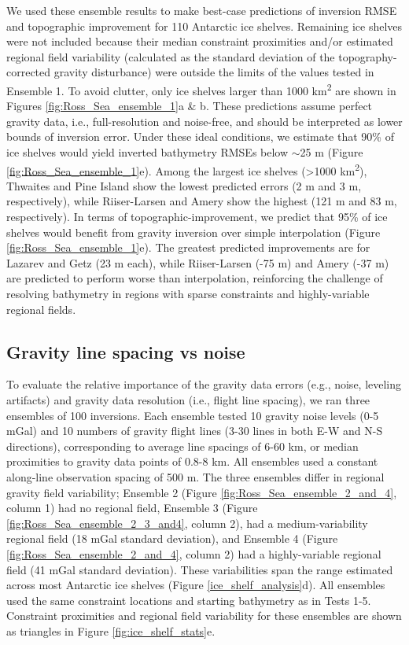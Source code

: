 \documentclass[tc, manuscript]{copernicus}
\begin{document}
We used these ensemble results to make best-case predictions of inversion RMSE and topographic improvement for 110 Antarctic ice shelves. Remaining ice shelves were not included because their median constraint proximities and/or estimated regional field variability (calculated as the standard deviation of the topography-corrected gravity disturbance) were outside the limits of the values tested in Ensemble 1. To avoid clutter, only ice shelves larger than 1000 km\textsuperscript{2} are shown in Figures \ref{fig:Ross_Sea_ensemble_1}a \& b. These predictions assume perfect gravity data, i.e., full-resolution and noise-free, and should be interpreted as lower bounds of inversion error. Under these ideal conditions, we estimate that 90\% of ice shelves would yield inverted bathymetry RMSEs below $\sim$25 m (Figure \ref{fig:Ross_Sea_ensemble_1}e). Among the largest ice shelves (\textgreater 1000 km\textsuperscript{2}), Thwaites and Pine Island show the lowest predicted errors (2 m and 3 m, respectively), while Riiser-Larsen and Amery show the highest (121 m and 83 m, respectively). In terms of topographic-improvement, we predict that 95\% of ice shelves would benefit from gravity inversion over simple interpolation (Figure \ref{fig:Ross_Sea_ensemble_1}e). The greatest predicted improvements are for Lazarev and Getz (23 m each), while Riiser-Larsen (-75 m) and Amery (-37 m) are predicted to perform worse than interpolation, reinforcing the challenge of resolving bathymetry in regions with sparse constraints and highly-variable regional fields.

\subsection{Gravity line spacing vs noise}
To evaluate the relative importance of the gravity data errors (e.g., noise, leveling artifacts) and gravity data resolution (i.e., flight line spacing), we ran three ensembles of 100 inversions. Each ensemble tested 10 gravity noise levels (0-5 mGal) and 10 numbers of gravity flight lines (3-30 lines in both E-W and N-S directions), corresponding to average line spacings of 6-60 km, or median proximities to gravity data points of 0.8-8 km. All ensembles used a constant along-line observation spacing of 500 m. The three ensembles differ in regional gravity field variability; Ensemble 2 (Figure \ref{fig:Ross_Sea_ensemble_2_and_4}, column 1) had no regional field, Ensemble 3 (Figure \ref{fig:Ross_Sea_ensemble_2_3_and4}, column 2), had a medium-variability regional field (18 mGal standard deviation), and Ensemble 4 (Figure \ref{fig:Ross_Sea_ensemble_2_and_4}, column 2) had a highly-variable regional field (41 mGal standard deviation). These variabilities span the range estimated across most Antarctic ice shelves (Figure \ref{ice_shelf_analysis}d). All ensembles used the same constraint locations and starting bathymetry as in Tests 1-5. Constraint proximities and regional field variability for these ensembles are shown as triangles in Figure \ref{fig:ice_shelf_stats}e.
\end{document}
